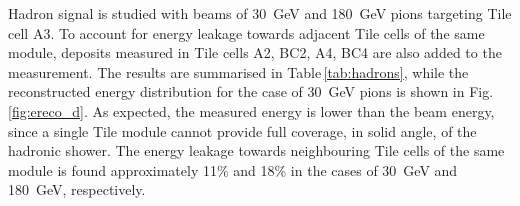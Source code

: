 Hadron signal is studied with beams of \SI{30}{GeV} and \SI{180}{GeV} pions targeting Tile cell A3. To account for energy leakage
towards adjacent Tile cells of the same module, deposits measured in Tile cells A2, BC2, A4, BC4 are also added to the measurement. 
The results are summarised in Table\,\ref{tab:hadrons}, while the reconstructed energy distribution for the case of \SI{30}{GeV} pions is
shown in Fig.\,\ref{fig:ereco_d}. As expected, the measured energy is lower than the beam energy, since a single Tile module 
cannot provide full coverage, in solid angle, of the hadronic shower. The energy leakage towards neighbouring Tile cells of the 
same module is found approximately 11\% and 18\% in the cases of \SI{30}{GeV} and \SI{180}{GeV}, respectively.

